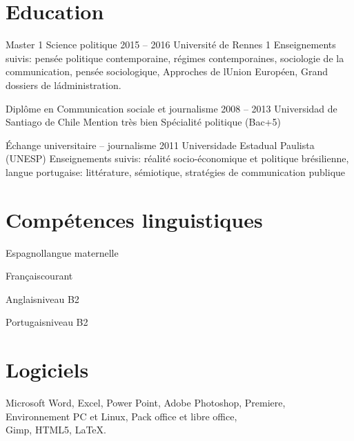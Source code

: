 \documentclass{tccv}
\begin{document}
\section{Education}

\begin{yearlist}

\item[Master 1 Science politique]{2015 -- 2016}
     {Université de Rennes 1}
     {Enseignements suivis: pensée politique contemporaine, régimes contemporaines, sociologie de la communication, pensée sociologique, Approches de lUnion Européen, Grand dossiers de l\' administration.}


  

\item[Diplôme en Communication sociale et journalisme]{2008 -- 2013}
     {Universidad de Santiago de Chile}
     {Mention très bien
      Spécialité politique
      (Bac+5)}

     
\item[Échange universitaire -- journalisme]{2011}
     {Universidade Estadual Paulista (UNESP)}
     {Enseignements suivis: réalité socio-économique et politique brésilienne, langue portugaise: littérature, sémiotique, stratégies de communication publique}


\end{yearlist}



\section{Compétences linguistiques}

\begin{factlist}
\item{Espagnol}{langue maternelle}	
\item{Français}{courant}	
\item{Anglais}{niveau B2}	
\item{Portugais}{niveau B2}
\end{factlist}

\section{Logiciels}

\begin{factlist}

\item{}{Microsoft Word, Excel, Power Point, Adobe Photoshop, Premiere, \\
Environnement PC et Linux,
Pack office et libre office, \\
Gimp,
HTML5,
\LaTeX.
}


\end{factlist}
\end{document}
